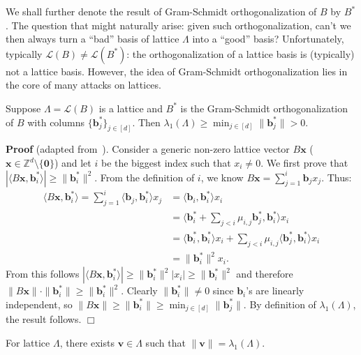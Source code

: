 \documentclass{template}
\newcommand{\qedwhite}{\hfill \ensuremath{\Box}}
\begin{document}
We shall further denote the result of Gram-Schmidt orthogonalization of $B$ by
$B^*$. The question that might naturally arise: given such orthogonalization,
can't we then always turn a ``bad'' basis of lattice $\Lambda$ into a ``good''
basis? Unfortunately, typically $\mathcal{L}(B) \neq \mathcal{L}(B^*)$: the
orthogonalization of a lattice basis is (typically) not a lattice basis.
However, the idea of Gram-Schmidt orthogonalization lies in the core of many
attacks on lattices. 
\begin{proposition}\label{prop:gram-schmidt-props} Suppose $\Lambda =
    \mathcal{L}(B)$ is a lattice and $B^*$ is the Gram-Schmidt orthogonalization
    of $B$ with columns $\{\mathbf{b}^*_j\}_{j \in [d]}$. Then
    $\lambda_1(\Lambda) \geq \min_{j \in [d]}\|\mathbf{b}_j^*\| > 0$.
\end{proposition}

\textbf{Proof} (adapted from~\cite{complexity-goldwasser}). Consider a generic
non-zero lattice vector $B\mathbf{x}$ ($\mathbf{x} \in \mathbb{Z}^d \setminus
\{\mathbf{0}\}$) and let $i$ be the biggest index such that $x_i \neq 0$. We
first prove that $|\langle B\mathbf{x}, \mathbf{b}_i^* \rangle| \geq
\|\mathbf{b}_i^*\|^2$. From the definition of $i$, we know $B\mathbf{x} =
\sum_{j=1}^i \mathbf{b}_jx_j$. Thus:
\begin{align*}
    \langle B\mathbf{x}, \mathbf{b}_i^* \rangle = \sum_{j=1}^i \langle \mathbf{b}_j, \mathbf{b}_i^*\rangle x_j &= \langle \mathbf{b}_i,\mathbf{b}_i^* \rangle x_i\\
    &= \langle \mathbf{b}_i^* + \sum_{j<i}\mu_{i,j}\mathbf{b}_j^*, \mathbf{b}_i^*\rangle x_i \\
    &= \langle \mathbf{b}_i^*, \mathbf{b}_i^*\rangle x_i + \sum_{j < i}\mu_{i,j}\langle \mathbf{b}_j^*, \mathbf{b}_i^*\rangle x_i \\
    &= \|\mathbf{b}_i^*\|^2x_i.
\end{align*}
From this follows $|\langle B\mathbf{x}, \mathbf{b}_i^* \rangle| \geq
\|\mathbf{b}_i^*\|^2|x_i| \geq \|\mathbf{b}_i^*\|^2$ and therefore
$\|B\mathbf{x}\|\cdot\|\mathbf{b}_i^*\| \geq \|\mathbf{b}_i^*\|^2$. Clearly
$\|\mathbf{b}_i^*\| \neq 0$ since $\mathbf{b}_i$'s are linearly independent, so
$\|B\mathbf{x}\| \geq \|\mathbf{b}_i^*\| \geq \min_{j \in
[d]}\|\mathbf{b}_j^*\|$. By definition of $\lambda_1(\Lambda)$, the result
follows. \qedwhite

\begin{proposition}
    For lattice $\Lambda$, there exists $\mathbf{v} \in \Lambda$ such that
    $\|\mathbf{v}\| = \lambda_1(\Lambda)$.
\end{proposition}
\end{document}
